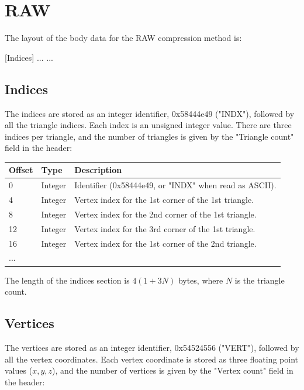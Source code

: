 \section{RAW}
The layout of the body data for the RAW compression method is:

[Indices]\newline
[Vertices]\newline
[Normals]\newline
[UV map 0]\newline
[UV map 1]\newline
...\newline
[UV map N]\newline
...

\subsection{Indices}
The indices are stored as an integer identifier, 0x58444e49 ("INDX"), followed
by all the triangle indices. Each index is an unsigned integer value. There are
three indices per triangle, and the number of triangles is given by the
"Triangle count" field in the header:

\begin{tabular}{|l|l|l|}\hline
\textbf{Offset} &  \textbf{Type} & \textbf{Description}\\ \hline
0 & Integer & Identifier (0x58444e49, or "INDX" when read as ASCII).\\ \hline
4 & Integer & Vertex index for the 1st corner of the 1st triangle.\\ \hline
8 & Integer & Vertex index for the 2nd corner of the 1st triangle.\\ \hline
12 & Integer & Vertex index for the 3rd corner of the 1st triangle.\\ \hline
16 & Integer & Vertex index for the 1st corner of the 2nd triangle.\\ \hline
... & & \\ \hline
\end{tabular}

The length of the indices section is $4(1+3N)$ bytes, where $N$ is the triangle
count.

\subsection{Vertices}
The vertices are stored as an integer identifier, 0x54524556 ("VERT"), followed
by all the vertex coordinates. Each vertex coordinate is stored as three
floating point values ($x,y,z$), and the number of vertices is given by the
"Vertex count" field in the header:

